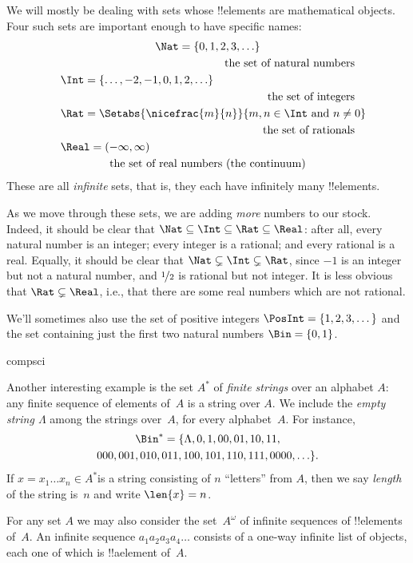 \documentclass[../../../include/open-logic-section]{subfiles}
\begin{document}

\begin{ex}
We will mostly be dealing with sets whose !!{element}s are
mathematical objects. Four such sets are important enough to have
specific names:
\begin{multline*}
    \Nat = \{0, 1, 2, 3, \ldots\} \\
    \shoveright{\text{the set of natural numbers}}\\
    \shoveleft{\Int = \{\ldots, -2, -1, 0, 1, 2, \ldots\}} \\
    \shoveright{\text{the set of integers}}\\
    \shoveleft{\Rat = \Setabs{\nicefrac{m}{n}}{m, n \in \Int\text{ and }n \neq 0}}\\
    \shoveright{\text{the set of rationals}}\\
    \shoveleft{\Real = (-\infty, \infty)}\\
    \text{the set of real numbers (the continuum)}
\end{multline*}
These are all \emph{infinite} sets, that is, they each have
infinitely many !!{element}s.

As we move through these sets, we are adding \emph{more} numbers to
our stock. Indeed, it should be clear that $\Nat \subseteq \Int
\subseteq \Rat \subseteq \Real$: after all, every natural number is an
integer; every integer is a rational; and every rational is a real.
Equally, it should be clear that $\Nat \subsetneq \Int \subsetneq
\Rat$, since $-1$ is an integer but not a natural number, and
$\nicefrac{1}{2}$ is rational but not integer. It is less obvious
that $\Rat \subsetneq \Real$, i.e., that there are some real numbers
which are not rational. 

We'll sometimes also use the set of positive integers $\PosInt = \{1,
2, 3, \dots\}$ and the set containing just the first two natural
numbers $\Bin = \{0, 1\}$.
\end{ex}

\begin{tagblock}{compsci}
\begin{ex}[Strings] 
Another interesting example  is the set $A^{*}$ of \emph{finite
strings} over an alphabet $A$: any finite sequence of elements of~$A$
is a string over $A$. We include the \emph{empty string $\Lambda$}
among the strings over~$A$, for every alphabet~$A$. For instance,
\begin{multline*}
\Bin^*
=\{\Lambda,0,1,00,01,10,11,\\
000,001,010,011,100,101,110,111,0000,\ldots\}.
\end{multline*}
If $x=x_{1}\ldots x_{n}\in A^{*}$is a string consisting of $n$
``letters'' from $A$, then we say \emph{length} of the string is~$n$
and write $\len{x}=n$.
\end{ex}
\end{tagblock}

\begin{ex}
For any set $A$ we may also consider the set~$A^\omega$ of infinite
sequences of !!{element}s of~$A$. An infinite sequence
$a_1a_2a_3a_4\dots$ consists of a one-way infinite list of objects,
each one of which is !!a{element} of~$A$.
\end{ex}
\end{document}
